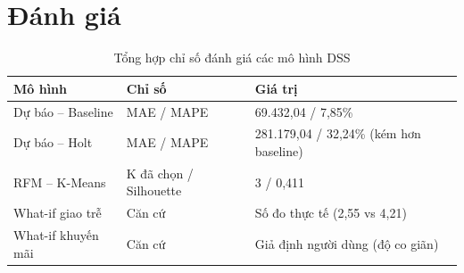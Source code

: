 \documentclass[12pt,a4paper]{article}
\begin{document}
\section{Đánh giá}

\begin{table}[h]
\centering
\caption{Tổng hợp chỉ số đánh giá các mô hình DSS}\label{tab:eval-summary}
\small
\begin{tabularx}{\textwidth}{@{}l l X@{}}
\toprule
\textbf{Mô hình} & \textbf{Chỉ số} & \textbf{Giá trị}\\
\midrule
Dự báo -- Baseline & MAE / MAPE & 69.432,04 / 7,85\%\\
Dự báo -- Holt & MAE / MAPE & 281.179,04 / 32,24\% (kém hơn baseline)\\
RFM -- K-Means & K đã chọn / Silhouette & 3 / 0,411\\
What-if giao trễ & Căn cứ & Số đo thực tế (2,55 vs 4,21)\\
What-if khuyến mãi & Căn cứ & Giả định người dùng (độ co giãn)\\
\bottomrule
\end{tabularx}
\end{table}
\end{document}
